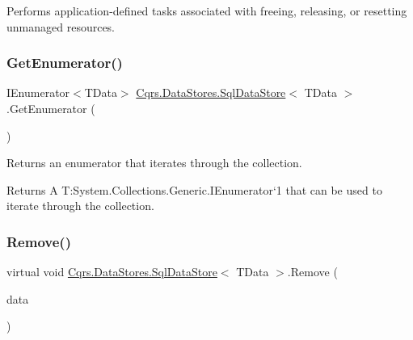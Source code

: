 Performs application-\/defined tasks associated with freeing, releasing, or resetting unmanaged resources. 

\mbox{\label{classCqrs_1_1DataStores_1_1SqlDataStore_a774a0a12d6a89479cf25191916f51c47}} 
\subsubsection{\texorpdfstring{Get\+Enumerator()}{GetEnumerator()}}
{\footnotesize\ttfamily I\+Enumerator$<$T\+Data$>$ \hyperlink{classCqrs_1_1DataStores_1_1SqlDataStore}{Cqrs.\+Data\+Stores.\+Sql\+Data\+Store}$<$ T\+Data $>$.Get\+Enumerator (\begin{DoxyParamCaption}{ }\end{DoxyParamCaption})}



Returns an enumerator that iterates through the collection. 

\begin{DoxyReturn}{Returns}
A T\+:\+System.\+Collections.\+Generic.\+I\+Enumerator`1 that can be used to iterate through the collection. 
\end{DoxyReturn}
\mbox{\label{classCqrs_1_1DataStores_1_1SqlDataStore_a898d15db199f054865a96ac646bf54fb}} 
\subsubsection{\texorpdfstring{Remove()}{Remove()}}
{\footnotesize\ttfamily virtual void \hyperlink{classCqrs_1_1DataStores_1_1SqlDataStore}{Cqrs.\+Data\+Stores.\+Sql\+Data\+Store}$<$ T\+Data $>$.Remove (\begin{DoxyParamCaption}\item[{T\+Data}]{data }\end{DoxyParamCaption})\hspace{0.3cm}{\ttfamily [virtual]}}



